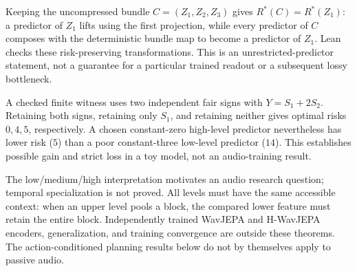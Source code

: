 \documentclass[11pt]{article}
\begin{document}
Keeping the uncompressed bundle $C=(Z_1,Z_2,Z_3)$ gives
$R^*(C)=R^*(Z_1)$: a predictor of $Z_1$ lifts using the first projection,
while every predictor of $C$ composes with the deterministic bundle map to
become a predictor of $Z_1$. Lean checks these risk-preserving transformations.
This is an unrestricted-predictor statement, not a guarantee for a particular
trained readout or a subsequent lossy bottleneck.

A checked finite witness uses two independent fair signs with
$Y=S_1+2S_2$. Retaining both signs, retaining only $S_1$, and retaining
neither gives optimal risks $0,4,5$, respectively. A chosen constant-zero
high-level predictor nevertheless has lower risk ($5$) than a poor
constant-three low-level predictor ($14$). This establishes possible gain
and strict loss in a toy model, not an audio-training result.

The low/medium/high interpretation motivates an audio research question;
temporal specialization is not proved. All levels must have the same
accessible context: when an upper level pools a block, the compared lower
feature must retain the entire block. Independently trained WavJEPA and
H-WavJEPA encoders, generalization, and training convergence are outside these
theorems. The action-conditioned planning results below do not by themselves
apply to passive audio.
\end{document}
